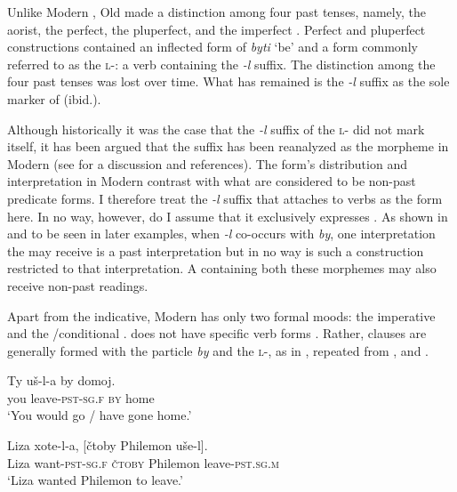\documentclass[output=paper,modfonts,newtxmath,hidelinks,]{langscibook}
\begin{document}
\noindent Unlike Modern , Old  made a distinction among four past tenses, namely, the aorist, the perfect, the pluperfect, and the imperfect \citep[38]{Mezhevich2006}. Perfect and pluperfect constructions contained an inflected form of \textit{byti} ‘be’ and a form commonly referred to as the \textsc{l}-: a verb containing the \textit{-l} suffix. The distinction among the four past tenses was lost over time. What has remained is the \textit{-l} suffix as the sole marker of  (ibid.).

Although historically it was the case that the \textit{-l} suffix of the \textsc{l}- did not mark  itself, it has been argued that the suffix has been reanalyzed as the  morpheme in Modern  (see \citealt{Mezhevich2006} for a discussion and references). The form’s distribution and interpretation in Modern  contrast with what are considered to be non-past predicate forms. I therefore treat the \textit{-l} suffix that attaches to verbs as the  form here. In no way, however, do I assume that it exclusively expresses . As shown in  and to be seen in later examples, when \textit{{}-}\textit{l\-} co-occurs with \textit{by}, one interpretation the  may receive is a past interpretation but in no way is such a construction restricted to that interpretation. A  containing both these morphemes may also receive non-past readings.

Apart from the indicative, Modern  has only two formal moods: the imperative and the /conditional \citep[157]{Cubberley2002}.  does not have specific  verb forms \citep[118]{Mezhevich2006}. Rather,  clauses are generally formed with the particle \textit{by} and the \textsc{l}-, as in , repeated from , and .

\ea \label{10:ex5}
\gll Ty uš-l-a by domoj.\\
     you leave\textsc{-pst-sg.f} \textsc{by} home\\
\glt `You would go / have gone home.' \hfill \citep[152]{Mezhevich2006}
\z

\ea \label{10:ex6}
\gll Liza xote-l-a, [čtoby Philemon uše-l].\\
     Liza want\textsc{-pst-sg.f} { }\textsc{čtoby} Philemon leave-\textsc{pst.sg.m}\\
\glt `Liza wanted Philemon to leave.' \hfill \citep[148]{Mezhevich2006}
\z
\end{document}
